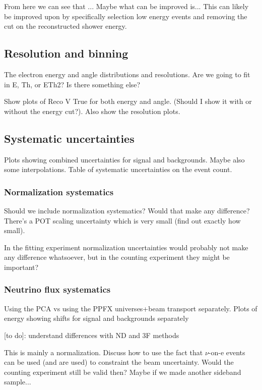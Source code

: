From here we can see that ... Maybe what can be improved is...
This can likely be improved upon by specifically selection low energy events and removing the cut on the reconstructed shower energy. 

\subsection{Resolution and binning}
The electron energy and angle distributions and resolutions. Are we going to fit in E, Th, or ETh2? Is there something else?

Show plots of Reco V True for both energy and angle. (Should I show it with or without the energy cut?). Also show the resolution plots.

\subsection{Systematic uncertainties}
Plots showing combined uncertainties for signal and backgrounds. Maybe also some interpolations. Table of systematic uncertainties on the event count.

\subsubsection*{Normalization systematics}
Should we include normalization systematics? Would that make any difference? There's a POT scaling uncertainty which is very small (find out exactly how small).

In the fitting experiment normalization uncertainties would probably not make any difference whatsoever, but in the counting experiment they might be important?

\subsubsection*{Neutrino flux systematics}
Using the PCA vs using the PPFX universes+beam transport separately. Plots of energy showing shifts for signal and backgrounds separately

[to do]: understand differences with ND and 3F methods

This is mainly a normalization. Discuss how to use the fact that $\nu$-on-e events can be used (and are used) to constraint the beam uncertainty. Would the counting experiment still be valid then? Maybe if we made another sideband sample...

